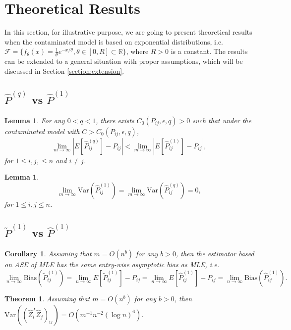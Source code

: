 \documentclass[a4paper]{article}
\newtheorem{lemma}[fact]{Lemma}
\newtheorem{theorem}[fact]{Theorem}
\newtheorem{corollary}[fact]{Corollary}
\renewcommand{\hat}{\widehat}
\begin{document}
\section{Theoretical Results}
\label{section:theory}
In this section, for illustrative purpose, we are going to present theoretical results when the contaminated model is based on exponential distributions, i.e. $\mathcal{F} = \{ f_{\theta}(x) = \frac{1}{\theta} e^{-x/\theta}, \theta \in [0, R] \subset \mathbb{R} \}$, where $R > 0$ is a constant. The results can be extended to a general situation with proper assumptions, which will be discussed in Section \ref{section:extension}.

\subsection{$\hat{P}^{(q)}$ vs $\hat{P}^{(1)}$}
\begin{lemma}
\label{lemma:ELqlEMLE}
For any $0 < q < 1$, there exists $C_0(P_{ij}, \epsilon, q) > 0$ such that under the contaminated model with $C > C_0(P_{ij}, \epsilon, q)$,
\[
	\lim_{m \to \infty} \left| E[\hat{P}^{(q)}_{ij}] - P_{ij} \right| < 
    \lim_{m \to \infty} \left| E[\hat{P}^{(1)}_{ij}] - P_{ij} \right|,
\]
for $1 \le i, j, \le n$ and $i \ne j$.
\end{lemma}

\begin{lemma}
\[
	\lim_{m \to \infty} \mathrm{Var}(\hat{P}^{(1)}_{ij})
    = \lim_{m \to \infty} \mathrm{Var}(\hat{P}^{(q)}_{ij}) = 0,
\]
for $1 \le i, j \le n$.
\end{lemma}


\subsection{$\widetilde{P}^{(1)}$ vs $\hat{P}^{(1)}$}
\begin{corollary}
\label{cor:L1Consistent}
Assuming that $m = O(n^b)$ for any $b > 0$, then the estimator based on ASE of MLE has the same entry-wise asymptotic bias as MLE, i.e.
\[
	\lim_{n \to \infty} \mathrm{Bias}(\widetilde{P}_{ij}^{(1)}) = \lim_{n \to \infty} E[\widetilde{P}_{ij}^{(1)}] - P_{ij} = \lim_{n \to \infty} E[\hat{P}^{(1)}_{ij}] - P_{ij}
    = \lim_{n \to \infty} \mathrm{Bias}(\hat{P}_{ij}^{(1)}).
\]
\end{corollary}

\begin{theorem}
\label{thm:VarASEL1}
Assuming that $m = O(n^b)$ for any $b > 0$, then $\mathrm{Var}((\hat{Z}_i^T \hat{Z}_j)_{\mathrm{tr}}) = O(m^{-1} n^{-2} (\log n)^6)$.
\end{theorem}
\end{document}

